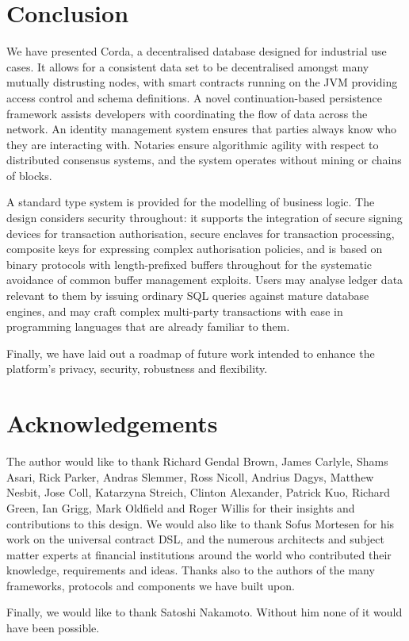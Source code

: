 \documentclass{article}
\begin{document}
\section{Conclusion}\label{sec:conclusion}

We have presented Corda, a decentralised database designed for industrial use cases. It allows for a consistent
data set to be decentralised amongst many mutually distrusting nodes, with smart contracts running on the JVM providing
access control and schema definitions. A novel continuation-based persistence framework assists developers with
coordinating the flow of data across the network. An identity management system ensures that parties always know
who they are interacting with. Notaries ensure algorithmic agility with respect to distributed consensus systems, and
the system operates without mining or chains of blocks.

A standard type system is provided for the modelling of business logic. The design considers security throughout:
it supports the integration of secure signing devices for transaction authorisation, secure enclaves for
transaction processing, composite keys for expressing complex authorisation policies, and is based on binary
protocols with length-prefixed buffers throughout for the systematic avoidance of common buffer management
exploits. Users may analyse ledger data relevant to them by issuing ordinary SQL queries against mature database
engines, and may craft complex multi-party transactions with ease in programming languages that are already
familiar to them.

Finally, we have laid out a roadmap of future work intended to enhance the platform's privacy, security, robustness
and flexibility.

\section{Acknowledgements}

The author would like to thank Richard Gendal Brown, James Carlyle, Shams Asari, Rick Parker, Andras Slemmer, Ross
Nicoll, Andrius Dagys, Matthew Nesbit, Jose Coll, Katarzyna Streich, Clinton Alexander, Patrick Kuo, Richard Green,
Ian Grigg, Mark Oldfield and Roger Willis for their insights and contributions to this design. We would also like
to thank Sofus Mortesen for his work on the universal contract DSL, and the numerous architects and subject matter
experts at financial institutions around the world who contributed their knowledge, requirements and ideas. Thanks
also to the authors of the many frameworks, protocols and components we have built upon.

Finally, we would like to thank Satoshi Nakamoto. Without him none of it would have been possible.



\end{document}
